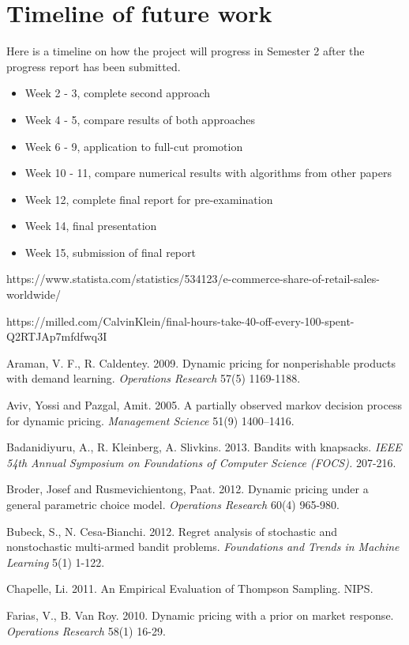 \documentclass[a4paper]{article}
\begin{document}
\section{Timeline of future work}
Here is a timeline on how the project will progress in Semester 2 after the progress report has been submitted. 
\begin{itemize}
	\item Week 2 - 3, complete second approach
	\item Week 4 - 5, compare results of both approaches
	\item Week 6 - 9, application to full-cut promotion
	\item Week 10 - 11, compare numerical results with algorithms from other papers
	\item Week 12, complete final report for pre-examination
	\item Week 14, final presentation
	\item Week 15, submission of final report
\end{itemize}
\begin{thebibliography}{9}
	https://www.statista.com/statistics/534123/e-commerce-share-of-retail-sales-worldwide/
	
	https://milled.com/CalvinKlein/final-hours-take-40-off-every-100-spent-Q2RTJAp7mfdfwq3I
	
	Araman, V. F., R. Caldentey. 2009. Dynamic pricing for nonperishable products with demand learning.
	\emph{Operations Research} 57(5) 1169-1188.
	
	Aviv, Yossi and Pazgal, Amit. 2005. A partially observed markov decision process for dynamic
	pricing. \emph{Management Science} 51(9) 1400–1416.
	
	Badanidiyuru, A., R. Kleinberg, A. Slivkins. 2013. Bandits with knapsacks. \emph{IEEE 54th Annual Symposium on Foundations of Computer Science (FOCS).} 207-216.	
	
	Broder, Josef and Rusmevichientong, Paat. 2012. Dynamic pricing under a general parametric choice model. \emph{Operations Research} 60(4) 965-980.
	
	Bubeck, S., N. Cesa-Bianchi. 2012. Regret analysis of stochastic and nonstochastic multi-armed bandit problems. \emph{Foundations and Trends in Machine Learning} 5(1) 1-122.
	
	Chapelle,  Li. 2011. An Empirical Evaluation of Thompson Sampling. NIPS. 
	
	Farias, V., B. Van Roy. 2010. Dynamic pricing with a prior on market response. \emph{Operations Research} 58(1) 16-29.
\end{thebibliography}
\end{document}
